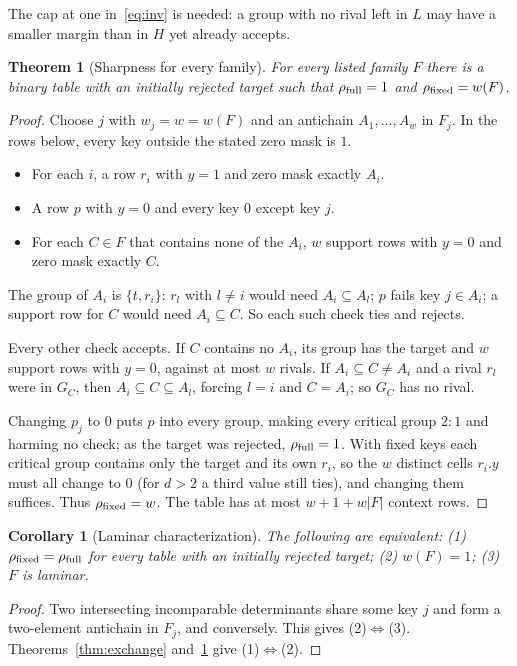 \documentclass[11pt]{article}
\newtheorem{theorem}{Theorem}
\newtheorem{corollary}{Corollary}
\theoremstyle{remark}
\newcommand{\rfull}{\rho_{\rm full}}
\newcommand{\rfix}{\rho_{\rm fixed}}
\begin{document}
The cap at one in~\eqref{eq:inv} is needed: a group with no rival left in $L$
may have a smaller margin than in $H$ yet already accepts.

\begin{theorem}[Sharpness for every family]\label{thm:sharp}
For every listed family $F$ there is a binary table with an initially rejected
target such that $\rfull=1$ and $\rfix=w(F)$.
\end{theorem}
\begin{proof}
Choose $j$ with $w_j=w=w(F)$ and an antichain $A_1,\ldots,A_w$ in $F_j$.
In the rows below, every key outside the stated zero mask is $1$.
\begin{itemize}
\item For each $i$, a row $r_i$ with $y=1$ and zero mask exactly $A_i$.
\item A row $p$ with $y=0$ and every key $0$ except key $j$.
\item For each $C\in F$ that contains none of the $A_i$, $w$ support rows with
$y=0$ and zero mask exactly $C$.
\end{itemize}
The group of $A_i$ is $\{t,r_i\}$: $r_l$ with $l\ne i$ would need
$A_i\subseteq A_l$; $p$ fails key $j\in A_i$; a support row for $C$ would need
$A_i\subseteq C$. So each such check ties and rejects.

Every other check accepts. If $C$ contains no $A_i$, its group has the target
and $w$ support rows with $y=0$, against at most $w$ rivals. If
$A_i\subseteq C\ne A_i$ and a rival $r_l$ were in $G_C$, then
$A_i\subseteq C\subseteq A_l$, forcing $l=i$ and $C=A_i$; so $G_C$ has no rival.

Changing $p_j$ to $0$ puts $p$ into every group, making every critical group
$2{:}1$ and harming no check; as the target was rejected, $\rfull=1$. With
fixed keys each critical group contains only the target and its own $r_i$, so
the $w$ distinct cells $r_i.y$ must all change to $0$ (for $d>2$ a third value
still ties), and changing them suffices.
Thus $\rfix=w$. The table has at most $w+1+w|F|$ context rows.
\end{proof}

\begin{corollary}[Laminar characterization]\label{cor:laminar}
The following are equivalent: (1) $\rfix=\rfull$ for every table with an initially rejected target;
(2) $w(F)=1$; (3) $F$ is laminar.
\end{corollary}
\begin{proof}
Two intersecting incomparable determinants share some key $j$ and form a
two-element antichain in $F_j$, and conversely. This gives (2)$\Leftrightarrow$(3).
Theorems~\ref{thm:exchange} and~\ref{thm:sharp} give (1)$\Leftrightarrow$(2).
\end{proof}
\end{document}
